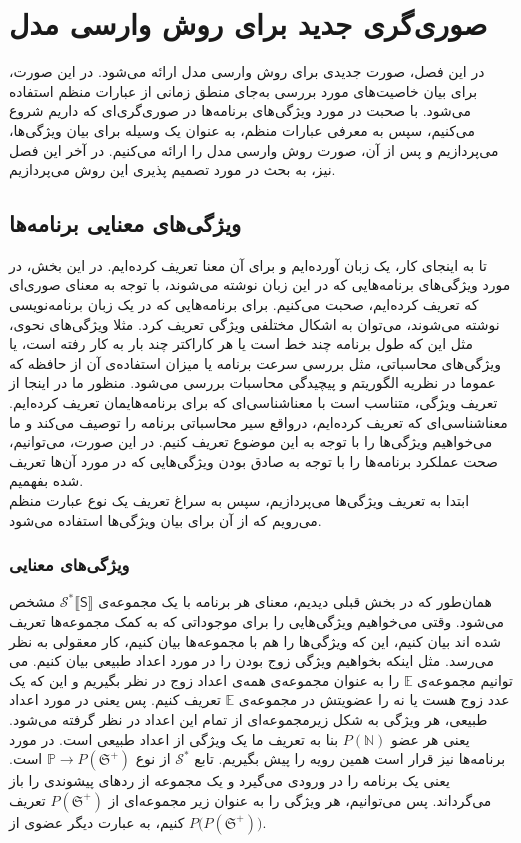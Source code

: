 
\chapter{صوری‌گری جدید برای روش وارسی مدل}

در این فصل، صورت جدیدی برای روش وارسی مدل ارائه ‌می‌شود. در این صورت، برای بیان خاصیت‌های مورد بررسی به‌جای منطق زمانی از عبارات منظم استفاده می‌شود. با صحبت در مورد ویژگی‌های برنامه‌ها در صوری‌گری‌ای که داریم شروع می‌کنیم، سپس به معرفی عبارات منظم، به عنوان یک وسیله برای بیان ویژگی‌ها، می‌پردازیم و پس از آن، صورت روش وارسی مدل را ارائه می‌کنیم. در آخر این فصل نیز، به بحث در مورد تصمیم پذیری این روش می‌پردازیم. 


\section{ویژگی‌های معنایی برنامه‌ها}
تا به اینجای کار، یک زبان آورده‌ایم و برای آن معنا تعریف کرده‌ایم. در این بخش، در مورد ویژگی‌های برنامه‌هایی که در این زبان نوشته می‌شوند، با توجه به معنای صوری‌ای که تعریف کرده‌ایم، صحبت می‌کنیم. برای برنامه‌هایی که در یک زبان برنامه‌نویسی نوشته می‌شوند، می‌توان به اشکال مختلفی ویژگی تعریف کرد. مثلا ویژگی‌های نحوی، مثل این که طول برنامه چند خط است یا هر کاراکتر چند بار به کار رفته است، یا ویژگی‌های محاسباتی، مثل بررسی‌ سرعت برنامه یا میزان استفاده‌ی آن از حافظه که عموما در نظریه الگوریتم و پیچیدگی محاسبات بررسی می‌شود. منظور ما در اینجا از تعریف ویژگی، متناسب است با معناشناسی‌ای که برای برنامه‌هایمان تعریف کرده‌ایم. معناشناسی‌ای که تعریف کرده‌ایم، درواقع سیر محاسباتی برنامه را توصیف می‌کند و ما می‌خواهیم ویژگی‌ها را با توجه به این موضوع تعریف کنیم. در این صورت، می‌توانیم، صحت عملکرد برنامه‌ها را با توجه به صادق بودن ویژگی‌هایی که در مورد آن‌ها تعریف شده بفهمیم.\\
ابتدا به تعریف ویژگی‌ها می‌پردازیم، سپس به سراغ تعریف یک نوع عبارت منظم می‌رویم که از آن برای بیان ویژگی‌ها استفاده می‌شود.
\subsection{ویژگی‌های معنایی}
همان‌طور که در بخش قبلی دیدیم، معنای هر برنامه با یک مجموعه‌ی 
$\mathcal{S^*}\llbracket {\mathsf{S}}\rrbracket$
مشخص می‌شود. وقتی می‌خواهیم ویژگی‌هایی را برای موجوداتی که به کمک مجموعه‌ها تعریف شده اند بیان کنیم، این که ویژگی‌ها را هم با مجموعه‌ها بیان کنیم، کار معقولی به نظر می‌رسد. مثل اینکه بخواهیم ویژگی زوج بودن را در مورد اعداد طبیعی بیان کنیم. می توانیم مجموعه‌ی $\mathbb{E}$ را به عنوان مجموعه‌ی همه‌ی اعداد زوج در نظر بگیریم و این که یک عدد زوج هست یا نه را عضویتش در مجموعه‌ی $\mathbb{E}$ تعریف کنیم. پس یعنی در مورد اعداد طبیعی، هر ویژگی به شکل زیرمجموعه‌ای از تمام این اعداد در نظر گرفته می‌شود. یعنی هر عضو 
$\mathit{P}(\mathbb{N})$
بنا به تعریف ما یک ویژگی از اعداد طبیعی است.
در مورد برنامه‌ها نیز قرار است همین رویه را پیش بگیریم. تابع 
$\mathcal{S^*}$
از نوع 
$\mathbb{P} \rightarrow \mathit{P}(\mathfrak{S^+})$
است. یعنی یک برنامه را در ورودی می‌گیرد و یک مجموعه از ردهای پیشوندی را باز می‌گرداند. پس می‌توانیم، هر ویژگی را به عنوان زیر مجموعه‌ای از 
$\mathit{P}(\mathfrak{S^+})$
تعریف کنیم، به عبارت دیگر عضوی از
$\mathit{P(P}(\mathfrak{S^+}))$.

